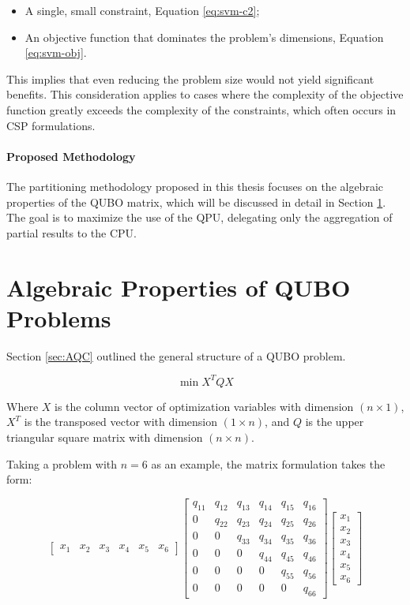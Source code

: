 \begin{itemize} 
	\item A single, small constraint, Equation \ref{eq:svm-c2}; 
	\item An objective function that dominates the problem's dimensions, Equation \ref{eq:svm-obj}. 
\end{itemize}

This implies that even reducing the problem size would not yield significant benefits. 
This consideration applies to cases where the complexity of the objective function greatly exceeds the complexity of the constraints, which often occurs in CSP formulations.

\paragraph{Proposed Methodology} The partitioning methodology proposed in this thesis focuses on the algebraic properties of the QUBO matrix, which will be discussed in detail in Section \ref{sec:prop}. 
The goal is to maximize the use of the QPU, delegating only the aggregation of partial results to the CPU.

\section{Algebraic Properties of QUBO Problems}\label{sec:prop}

Section \ref{sec:AQC} outlined the general structure of a QUBO problem. 

$$\min X^TQX$$ 

Where $X$ is the column vector of optimization variables with dimension $(n \times 1)$, $X^T$ is the transposed vector with dimension $(1 \times n)$, and $Q$ is the upper triangular square matrix with dimension $(n \times n)$.

Taking a problem with $n=6$ as an example, the matrix formulation takes the form:

\begin{equation}
    \begin{bmatrix}
        x_1 & x_2 & x_3 & x_4 & x_5 & x_6
    \end{bmatrix}
    \begin{bmatrix}
        q_{11} & q_{12} & q_{13} & q_{14} & q_{15} & q_{16} \\
        0 & q_{22} & q_{23} & q_{24} & q_{25} & q_{26} \\
        0 & 0 & q_{33} & q_{34} & q_{35} & q_{36} \\
        0 & 0 & 0 & q_{44} & q_{45} & q_{46} \\
        0 & 0 & 0 & 0 & q_{55} & q_{56} \\
        0 & 0 & 0 & 0 & 0 & q_{66}
    \end{bmatrix}
    \begin{bmatrix}
        x_1 \\
        x_2 \\
        x_3 \\
        x_4 \\
        x_5 \\
        x_6
    \end{bmatrix}
\end{equation}

